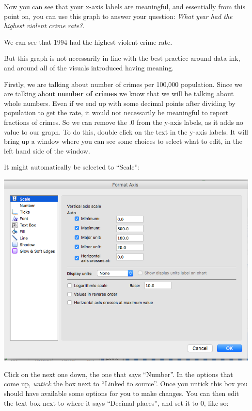 \documentclass[
]{book}
\begin{document}
Now you can see that your x-axis labels are meaningful, and essentially from this point on, you can use this graph to answer your question: \emph{What year had the highest violent crime rate?}.

We can see that 1994 had the highest violent crime rate.

But this graph is not necessarily in line with the best practice around data ink, and around all of the visuals introduced having meaning.

Firstly, we are talking about number of crimes per 100,000 population. Since we are talking about \textbf{number of crimes} we know that we will be talking about whole numbers. Even if we end up with some decimal points after dividing by population to get the rate, it would not necessarily be meaningful to report fractions of crimes. So we can remove the .0 from the y-axis labels, as it adds no value to our graph. To do this, double click on the text in the y-axis labels. It will bring up a window where you can see some choices to select what to edit, in the left hand side of the window.

It might automatically be selected to ``Scale'':

\includegraphics{imgs/desc_viz_7.png}

Click on the next one down, the one that says ``Number''. In the options that come up, \emph{untick} the box next to ``Linked to source''. Once you untick this box you should have available some options for you to make changes. You can then edit the text box next to where it says ``Decimal places'', and set it to 0, like so:
\end{document}
